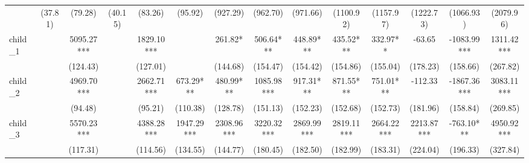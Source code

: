 \begin{subappendices}
{\begin{landscape}
\begin{table}[H]
{\begin{tabular}{lccccccccccccc}
                                         & (37.81)            & (79.28)                 & (40.15)                          & (83.26)     & (95.92)                  & (927.29)          & (962.70)    & (971.66)             & (1100.92)               & (1157.97)                & (1222.73)             & (1066.93)                 & (2079.96)                  \\
child_1                                  &                    & 5095.27***              &                                  & 1829.10***  &                          & 261.82*           & 506.64***   & 448.89***            & 435.52***               & 332.97**                 & -63.65                & -1083.99***               & 1311.42***                 \\
                                         &                    & (124.43)                &                                  & (127.01)    &                          & (144.68)          & (154.47)    & (154.42)             & (154.86)                & (155.04)                 & (178.23)              & (158.66)                  & (267.82)                   \\
child_2                                  &                    & 4969.70***              &                                  & 2662.71***  & 673.29***                & 480.99***         & 1085.98***  & 917.31***            & 871.55***               & 751.01***                & -112.33               & -1867.36***               & 3083.11***                 \\
                                         &                    & (94.48)                 &                                  & (95.21)     & (110.38)                 & (128.78)          & (151.13)    & (152.23)             & (152.68)                & (152.73)                 & (181.96)              & (158.84)                  & (269.85)                   \\
child_3                                  &                    & 5570.23***              &                                  & 4388.28***  & 1947.29***               & 2308.96***        & 3220.32***  & 2869.99***           & 2819.11***              & 2664.22***               & 2213.87***            & -763.10***                & 4950.92***                 \\
                                         &                    & (117.31)                &                                  & (114.56)    & (134.55)                 & (144.77)          & (180.45)    & (182.50)             & (182.99)                & (183.31)                 & (224.04)              & (196.33)                  & (327.84)                   \\

\end{tabular}}
\end{table}
\end{landscape}}
\end{subappendices}
